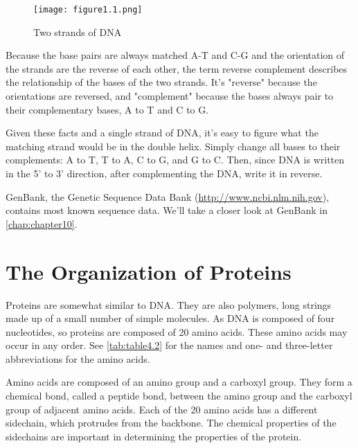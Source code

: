\begin{figure}
  \centering
  \texttt{[image: figure1.1.png]}
  \caption{Two strands of DNA}
  \label{fig:figure1.1}
\end{figure}

Because the base pairs are always matched A-T and C-G and the orientation of the strands are the reverse of each other, the term reverse complement describes the relationship of the bases of the two strands. It's "reverse" because the orientations are reversed, and "complement" because the bases always pair to their complementary bases, A to T and C to G.

Given these facts and a single strand of DNA, it's easy to figure what the matching strand would be in the double helix. Simply change all bases to their complements: A to T, T to A, C to G, and G to C. Then, since DNA is written in the 5' to 3' direction, after complementing the DNA, write it in reverse.

GenBank, the Genetic Sequence Data Bank (\href{http://www.ncbi.nlm.nih.gov}{http://www.ncbi.nlm.nih.gov}), contains most known sequence data. We'll take a closer look at GenBank in \autoref{chap:chapter10}. 

\section{The Organization of Proteins}
Proteins are somewhat similar to DNA. They are also polymers, long strings made up of a small number of simple molecules. As DNA is composed of four nucleotides, so proteins are composed of 20 amino acids. These amino acids may occur in any order. See \autoref{tab:table4.2} for the names and one- and three-letter abbreviations for the amino acids.  

Amino acids are composed of an amino group and a carboxyl group. They form a chemical bond, called a peptide bond, between the amino group and the carboxyl group of adjacent amino acids. Each of the 20 amino acids has a different sidechain, which protrudes from the backbone. The chemical properties of the sidechains are important in determining the properties of the protein.

